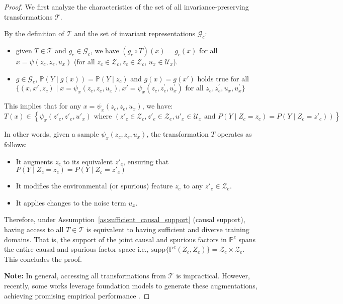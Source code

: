 \begin{proof}
We first analyze the characteristics of the set of all invariance-preserving transformations \( \mathcal{T} \).

By the definition of \( \mathcal{T} \) and the set of invariant representations \( \mathcal{G}_c \):

\begin{itemize}
    \item given $T\in \mathcal{T}$ and $g_c\in \mathcal{G}_c$, we have $(g_c\circ T)(x)=g_c(x)$ for all $x=\psi(z_c,z_e,u_x)$ (for all $z_c\in \mathcal{Z}_c, z_c\in \mathcal{Z}_c$, $u_x\in \mathcal{U}_x$).
    \item  $g\in \mathcal{G}_c$, $\mathbb{P}(Y\mid g(x)) = \mathbb{P}(Y\mid z_c)$ and $g(x)=g(x')$ holds true for all $\{(x,x',z_c)\mid  x= \psi_x(z_c, z_e, u_x), x'= \psi_x(z_c, z^{'}_e, u^{'}_x) \text{ for all }z_e,z^{'}_e, u_x, u^{'}_x\}$
\end{itemize}

This implies that for any $ x=\psi_x(z_c, z_e, u_x)$, we have:
\begin{equation*}
    T(x) \in \left \{\psi_x(z'_c, z'_e, u'_x) \text{ where } \left (z'_c\in\mathcal{Z}_c,z'_e\in \mathcal{Z}_e, u'_x\in \mathcal{U}_x \text{ and } P(Y\mid Z_c=z_c)=P(Y\mid Z_c=z'_c)\right ) \right \}
\end{equation*}

In other words, given a sample $\psi_x(z_c, z_e, u_x)$, the transformation $T$ operates as follows:
\begin{itemize}
    \item It augments \( z_c \) to its equivalent \( z'_c \), ensuring that $P(Y\mid Z_c=z_c)=P(Y\mid Z_c=z'_c)$
    \item It modifies the environmental (or spurious) feature $z_e$ to any $z'_e \in \mathcal{Z}_e$.
    \item It applies changes to the noise term $u_x$.
\end{itemize}

Therefore, under Assumption~\ref{as:sufficient_causal_support} (causal support), having access to all \( T \in \mathcal{T} \) is equivalent to having sufficient and diverse training domains. That is, the support of the joint causal and spurious factors in \( \mathbb{P}^{e} \) spans the entire causal and spurious factor space i.e., $\text{supp}\{\mathbb{P}^{e} (Z_c, Z_e)\} = \mathcal{Z}_c \times \mathcal{Z}_e$. This concludes the proof.




\textbf{Note:} In general, accessing all transformations from $\mathcal{T}$ is impractical. However, recently, some works leverage foundation models to generate these augmentations, achieving promising empirical performance \cite{ruan2021optimal}.
\end{proof}

